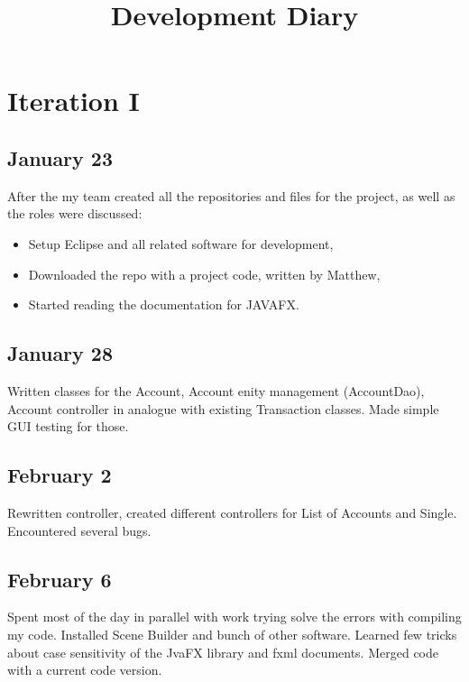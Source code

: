 \documentclass[11pt,letterpaper]{article}
\begin{document}
\title{Development Diary}

\section*{Iteration I}

\subsection*{January 23}

After the my team created all the repositories and files for the project, as well as the roles were discussed:
\begin{itemize}
\item Setup Eclipse and all related software for development,
\item Downloaded the repo with a project code, written by Matthew,
\item Started reading the documentation for JAVAFX.
\end{itemize}

\subsection*{January 28}

Written classes for the Account, Account enity management (AccountDao), Account controller in analogue with existing Transaction classes. Made simple GUI testing for those.

\subsection*{February 2}
Rewritten controller, created different controllers for List of Accounts and Single. Encountered several bugs.


\subsection*{February 6}

Spent most of the day in parallel with work trying solve the errors with compiling my code. Installed Scene Builder and bunch of other software. Learned few tricks about case sensitivity of the JvaFX library and fxml documents. Merged code with a current code version.
\end{document}
